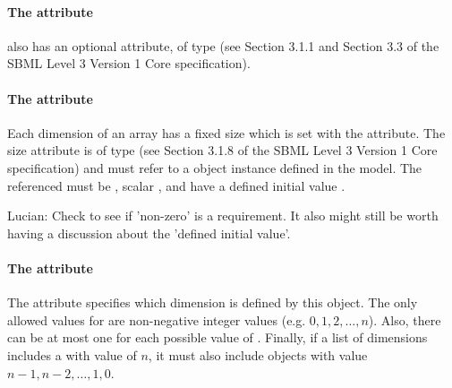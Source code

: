 \paragraph{The  attribute}

\Dimension also has an optional  attribute, of type   (see Section 3.1.1 and Section 3.3 of the SBML Level 3 Version 1 Core specification).

\paragraph{The  attribute}

Each dimension of an array has a fixed size which is set with the  attribute.   The size attribute is of type   (see Section 3.1.8 of the SBML Level 3 Version 1 Core specification) and must refer to a \Parameter object instance defined in the model.   The \Parameter referenced must be , scalar , and have a defined initial value .

{\color{red} Lucian: \notice Check to see if 'non-zero' is a requirement.  It also might still be worth having a discussion about the 'defined initial value'.}


\paragraph{The  attribute}

The  attribute specifies which dimension is defined by this \Dimension object.
The only allowed values for  are non-negative integer values (e.g. $0,1,2,\dots,n$).   Also, there can be at most one \Dimension for each possible value of .
Finally, if a list of dimensions includes a \Dimension with  value of $n$, it must also
include \Dimension objects with value $n-1, n-2, \dots , 1, 0$.

